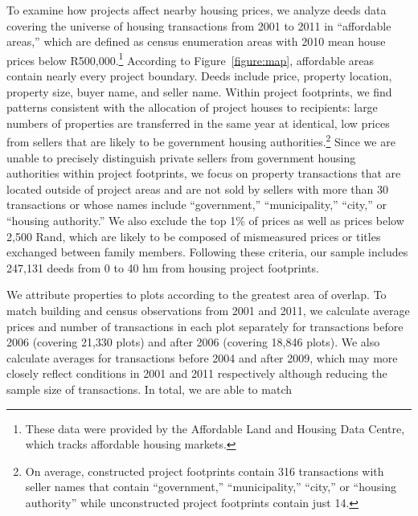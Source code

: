 \documentclass[12pt]{article}
\begin{document}
To examine how projects affect nearby housing prices, we analyze deeds data covering the universe of housing transactions from 2001 to 2011 in ``affordable areas,'' which are defined as census enumeration areas with 2010 mean house prices below R500,000.\footnote{These data were provided by the Affordable Land and Housing Data Centre, which tracks affordable housing markets.}  According to Figure~\ref{figure:map}, affordable areas contain nearly every project boundary.  Deeds include price, property location, property size, buyer name, and seller name.  Within project footprints, we find patterns consistent with the allocation of project houses to recipients: large numbers of properties are transferred in the same year at identical, low prices from sellers that are likely to be government housing authorities.\footnote{On average, constructed project footprints contain 316 transactions with seller names that contain ``government,'' ``municipality,'' ``city,'' or ``housing authority'' while unconstructed project footprints contain just 14.}  Since we are unable to precisely distinguish private sellers from government housing authorities within project footprints, we focus on property transactions that are located outside of project areas and are not sold by sellers with more than 30 transactions or whose names include ``government,'' ``municipality,'' ``city,'' or ``housing authority.''  We also exclude the top 1\% of prices as well as prices below 2,500 Rand, which are likely to be composed of mismeasured prices or titles exchanged between family members.  Following these criteria, our sample includes 247,131 deeds from 0 to 40 hm from housing project footprints.  

We attribute properties to plots according to the greatest area of overlap.  To match building and census observations from 2001 and 2011, we calculate average prices and number of transactions in each plot separately for transactions before 2006 (covering 21,330 plots) and after 2006 (covering 18,846 plots).  We also calculate averages for transactions before 2004 and after 2009, which may more closely reflect conditions in 2001 and 2011 respectively although reducing the sample size of transactions.  In total, we are able to match 







\end{document}
